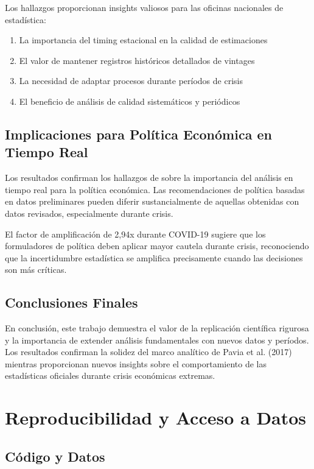\documentclass{article}
\begin{document}
Los hallazgos proporcionan insights valiosos para las oficinas nacionales de estadística:

\begin{enumerate}
\item La importancia del timing estacional en la calidad de estimaciones
\item El valor de mantener registros históricos detallados de vintages
\item La necesidad de adaptar procesos durante períodos de crisis
\item El beneficio de análisis de calidad sistemáticos y periódicos
\end{enumerate}

\subsection{Implicaciones para Política Económica en Tiempo Real}

Los resultados confirman los hallazgos de \citet{orphanides2001} sobre la importancia del análisis en tiempo real para la política económica. Las recomendaciones de política basadas en datos preliminares pueden diferir sustancialmente de aquellas obtenidas con datos revisados, especialmente durante crisis.

El factor de amplificación de 2,94x durante COVID-19 sugiere que los formuladores de política deben aplicar mayor cautela durante crisis, reconociendo que la incertidumbre estadística se amplifica precisamente cuando las decisiones son más críticas.

\subsection{Conclusiones Finales}
En conclusión, este trabajo demuestra el valor de la replicación científica rigurosa y la importancia de extender análisis fundamentales con nuevos datos y períodos. Los resultados confirman la solidez del marco analítico de Pavia et al. (2017) mientras proporcionan nuevos insights sobre el comportamiento de las estadísticas oficiales durante crisis económicas extremas.

\section{Reproducibilidad y Acceso a Datos}

\subsection{Código y Datos}
\end{document}
